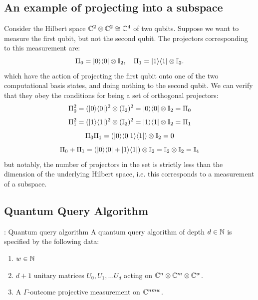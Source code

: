 \subsection*{An example of projecting into a subspace}
Consider the Hilbert space $\mathbb{C}^2 \otimes \mathbb{C}^2 \cong \mathbb{C}^4$ of two qubits. Suppose we want to measure the first qubit, but not the second qubit. The projectors corresponding to this measurement are:
\begin{equation}
    \Pi_0 = \lvert 0 \rangle \langle 0 \rvert \otimes \mathbb{I}_2, \quad \Pi_1 = \lvert 1 \rangle \langle 1 \rvert \otimes \mathbb{I}_2. 
\end{equation}
which have the action of projecting the first qubit onto one of the two computational basis states, and doing nothing to the second qubit. We can verify that they obey the conditions for being a set of orthogonal projectors:
\begin{equation}
    \Pi_0^2 = (\lvert 0 \rangle \langle 0 \rvert)^2 \otimes (\mathbb{I}_2)^2 = \lvert 0 \rangle \langle 0 \rvert \otimes \mathbb{I}_2 = \Pi_0
\end{equation}
\begin{equation}
    \Pi_1^2 = (\lvert 1 \rangle \langle 1 \rvert)^2 \otimes (\mathbb{I}_2)^2 = \lvert 1 \rangle \langle 1 \rvert \otimes \mathbb{I}_2 = \Pi_1
\end{equation}
\begin{equation}
    \Pi_0 \Pi_1 = (\lvert 0 \rangle\langle 0 \lvert 1 \rangle\langle 1 \rvert) \otimes \mathbb{I}_2 = 0
\end{equation}
\begin{equation}
    \Pi_0 + \Pi_1 = (\lvert 0 \rangle \langle 0 \rvert + \lvert 1 \rangle \langle 1 \rvert) \otimes \mathbb{I}_2 = \mathbb{I}_2 \otimes \mathbb{I}_2 = \mathbb{I}_4
\end{equation}
but notably, the number of projectors in the set is strictly less than the dimension of the underlying Hilbert space, i.e. this corresponds to a measurement of a subspace.

\subsection*{Quantum Query Algorithm}
\begin{defbox}{: Quantum query algorithm}
    A quantum query algorithm of depth $d \in \mathbb{N}$ is specified by the following data:
    \begin{enumerate}
        \item $w \in \mathbb{N}$
        \item $d + 1$ unitary matrices $U_0, U_1, \ldots U_d$ acting on $\mathbb{C}^n \otimes \mathbb{C}^m \otimes \mathbb{C}^w$. 
        \item A $\Gamma$-outcome projective measurement on $\mathbb{C}^{nmw}$. 
    \end{enumerate}
\end{defbox}

